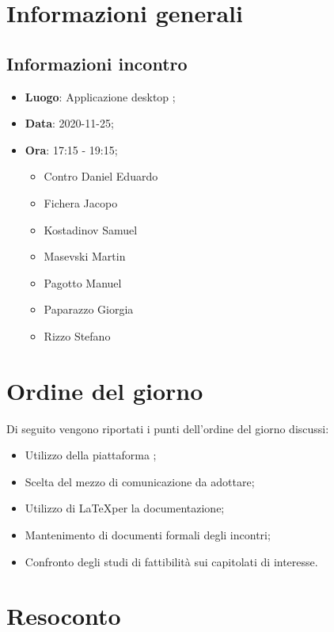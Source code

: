 \documentclass{article}
\begin{document}


\section{Informazioni generali}%
\label{sec:informazioni_generali}

\subsection{Informazioni incontro}%
\label{sub:informazioni_incontro}
\begin{itemize}
    \item \textbf{Luogo}: Applicazione desktop ;
    \item \textbf{Data}: 2020-11-25;
    \item \textbf{Ora}: 17:15 - 19:15;
    \begin{itemize}
		\item Contro Daniel Eduardo
		\item Fichera Jacopo
		\item Kostadinov Samuel
		\item Masevski Martin
		\item Pagotto Manuel
		\item Paparazzo Giorgia
		\item Rizzo Stefano
	\end{itemize}
\end{itemize}

\section{Ordine del giorno}%
\label{sec:ordine_del_giorno}

Di seguito vengono riportati i punti dell'ordine del giorno discussi:
\begin{itemize}
    \item Utilizzo della piattaforma ;
    \item Scelta del mezzo di comunicazione da adottare;
    \item Utilizzo di \LaTeX per la documentazione;
    \item Mantenimento di documenti formali degli incontri;
    \item Confronto degli studi di fattibilità sui capitolati di interesse.
\end{itemize}

\section{Resoconto}%
\label{sec:resoconto}
\end{document}
